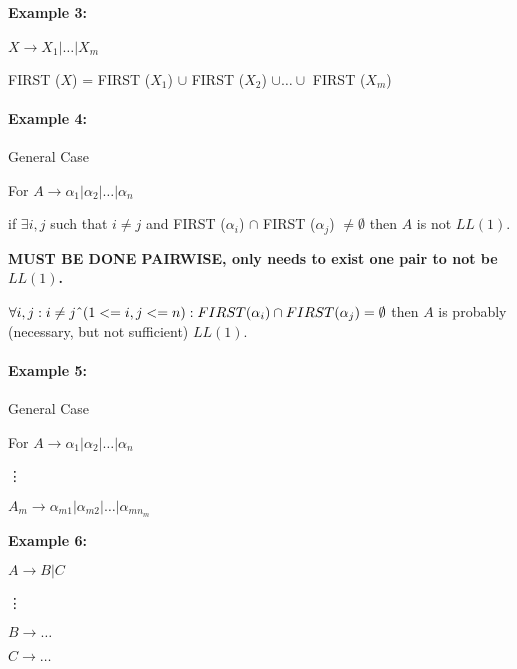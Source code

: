\documentclass[twocolumn]{article}
\begin{document}
\paragraph*{Example 3:}

$X \to X_1 | \dots | X_m$

FIRST ($X$) = FIRST ($X_1$) $\cup$ FIRST ($X_2$) $\cup \dots \cup$ FIRST ($X_m$)


\paragraph*{Example 4: }
General Case

For $A \to \alpha _1 | \alpha _2 | \dots | \alpha _n$

if $\exists i, j$ such that $i \neq j$ and FIRST ($\alpha _i$) $\cap$ FIRST ($\alpha _j$) $\neq \emptyset$ then $A$ is not $LL(1)$.

\textbf{MUST BE DONE PAIRWISE, only needs to exist one pair to not be $LL(1)$.}

$\forall i, j: i \neq j \string^ (1 <= i, j <= n): FIRST (\alpha _i) \cap FIRST (\alpha _j) = \emptyset$ then $A$ is probably (necessary, but not sufficient) $LL(1)$.

\paragraph*{Example 5:}
General Case

For $A \to \alpha _1 | \alpha _2 | \dots | \alpha _n$

\vdots

$A_m \to \alpha _{m1} | \alpha _{m2} | \dots | \alpha _{mn_m}$

\newpage

\textbf{Example 6:}

$A \to B | C$

\vdots

$B \to \dots$

$C \to \dots$
\end{document}
